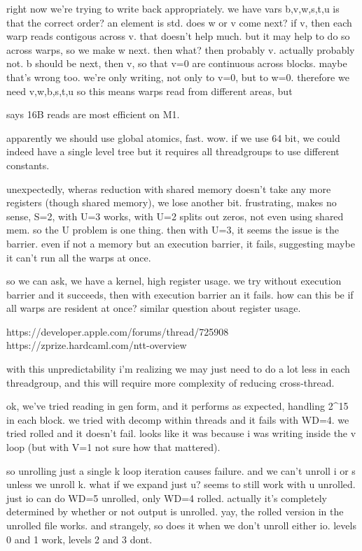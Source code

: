 right now we're trying to write back appropriately.
we have vars b,v,w,s,t,u
is that the correct order?
an element is std. does w or v come next? 
if v, then each warp reads contigous across v. that doesn't help much.
but it may help to do so across warps, so we make w next.
then what? then probably v. actually probably not. b should be next, then v, so that v=0 are continuous across blocks. 
maybe that's wrong too. we're only writing, not only to v=0, but to w=0. therefore we need
v,w,b,s,t,u
so this means warps read from different areas, but 


says 16B reads are most efficient on M1.



apparently we should use global atomics, fast. wow. if we use 64 bit, we could indeed have a single level tree but it requires all threadgroups to use different constants. 


unexpectedly, wheras reduction with shared memory doesn't take any more registers (though shared memory), we lose another bit. 
frustrating, makes no sense, S=2, with U=3 works, with U=2 splits out zeros, not even using shared mem. 
so the U problem is one thing.
then with U=3, it seems the issue is the barrier. even if not a memory but an execution barrier, it fails, suggesting maybe it can't run all the warps at once. 

so we can ask, we have a kernel, high register usage.
we try without execution barrier and it succeeds, then with execution barrier an it fails. how can this be if all warps are resident at once?
similar question about register usage.

https://developer.apple.com/forums/thread/725908
https://zprize.hardcaml.com/ntt-overview

with this unpredictability i'm realizing we may just need to do a lot less in each threadgroup, and this will require more complexity of reducing cross-thread. 

ok, we've tried reading in gen form, and it performs as expected, handling 2^15 in each block.
we tried with decomp within threads and it fails with WD=4. we tried rolled and it doesn't fail. 
looks like it was because i was writing inside the v loop (but with V=1 not sure how that mattered).

so unrolling just a single k loop iteration causes failure. and we can't unroll i or s unless we unroll k.
what if we expand just u?
seems to still work with u unrolled. 
just io can do WD=5 unrolled, only WD=4 rolled. actually it's completely determined by whether or not output is unrolled.
yay, the rolled version in the unrolled file works. and strangely, so does it when we don't unroll either io.
levels 0 and 1 work, levels 2 and 3 dont.


